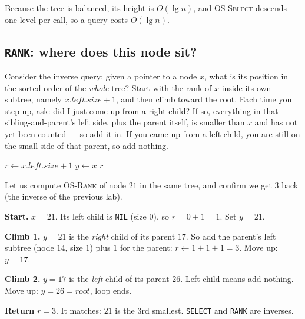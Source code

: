 Because the tree is balanced, its height is $O(\lg n)$, and
\textsc{OS-Select} descends one level per call, so a query costs $O(\lg n)$.

\subsection{\texttt{RANK}: where does this node sit?}

Consider the inverse query: given a pointer to a node $x$, what is its position in the
sorted order of the \emph{whole} tree? Start with the rank of $x$ inside its own
subtree, namely $x.\mathit{left}.\mathit{size} + 1$, and then climb toward the
root. Each time you step up, ask: did I just come up from a right child? If so,
everything in that sibling-and-parent's left side, plus the parent itself, is
smaller than $x$ and has not yet been counted --- so add it in. If you came up from
a left child, you are still on the small side of that parent, so add nothing.

\begin{algorithm}[H]
\caption{\textsc{OS-Rank}$(T, x)$ --- the position of node $x$ in sorted order}
$r \gets x.\mathit{left}.\mathit{size} + 1$\;
$y \gets x$\;
\Return $r$\;
\end{algorithm}

\begin{labbox}
Let us compute \textsc{OS-Rank} of node $21$ in the same tree, and confirm we get
$3$ back (the inverse of the previous lab).

\textbf{Start.} $x = 21$. Its left child is \texttt{NIL} (size $0$), so
$r = 0 + 1 = 1$. Set $y = 21$.

\textbf{Climb 1.} $y = 21$ is the \emph{right} child of its parent $17$. So add
the parent's left subtree (node $14$, size $1$) plus $1$ for the parent:
$r \gets 1 + 1 + 1 = 3$. Move up: $y = 17$.

\textbf{Climb 2.} $y = 17$ is the \emph{left} child of its parent $26$. Left
child means add nothing. Move up: $y = 26 = \mathit{root}$, loop ends.

\textbf{Return} $r = 3$. It matches: $21$ is the 3rd smallest. \texttt{SELECT}
and \texttt{RANK} are inverses.
\end{labbox}

